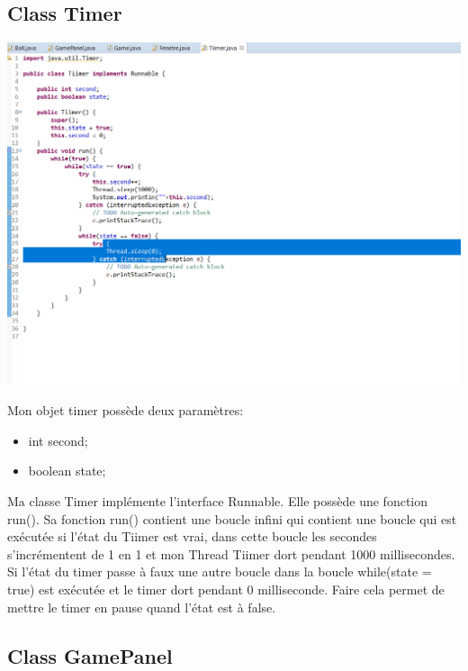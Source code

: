 \documentclass{article}
\begin{document}
\subsection{Class Timer}
\vspace{5mm}
\begin{center}
  \includegraphics[scale=0.5]{Tiimer.png}
\end{center}
\vspace{1mm}
Mon objet timer possède deux paramètres:
\begin{itemize}
\item int second;
\item boolean state;
\end{itemize}
\vspace{5mm}

Ma classe Timer implémente l'interface Runnable. Elle possède une fonction run(). Sa fonction run() contient une boucle infini qui contient une boucle qui est exécutée si l'état du Tiimer est vrai, dans cette boucle les secondes s'incrémentent de 1 en 1 et mon Thread Tiimer dort pendant 1000 millisecondes. Si l'état du timer passe à faux une autre boucle dans la boucle while(state = true) est exécutée et le timer dort pendant 0 milliseconde. Faire cela permet de mettre le timer en pause quand l'état est à false. \newpage

\subsection{Class GamePanel}
\label{subsection:GamePanel}
\end{document}

